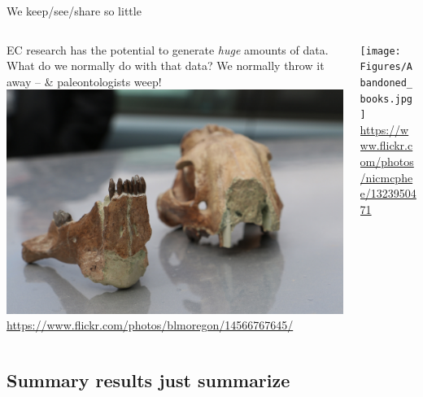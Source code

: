 \documentclass{beamer}
\newcommand{\linespace}{\vskip 0.25cm}
\begin{document}
\begin{frame}{We keep/see/share so little}
	
	\begin{columns}
		\begin{column}{0.6 \linewidth}
			EC research has the potential to generate \emph{huge} amounts of data.
			\linespace
			What do we normally do with that data?
			\linespace
			We normally throw it away -- \& paleontologists weep!
			\linespace
			\includegraphics[width = 0.8 \linewidth]{Figures/FossilsMedium.jpg} \\
			\tiny{\url{https://www.flickr.com/photos/blmoregon/14566767645/}}
		\end{column}
		\begin{column}{0.4 \linewidth}
			\texttt{[image: Figures/Abandoned\_books.jpg]} \\
			\tiny{\url{https://www.flickr.com/photos/nicmcphee/1323950471}}
		\end{column}
	\end{columns}
\end{frame}

\subsection{Summary results just summarize}
\end{document}
